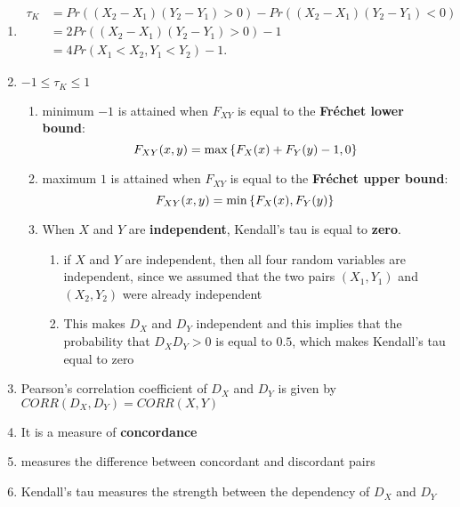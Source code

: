 \begin{enumerate}
    \item[] \begin{align*}
        \tau_K 
        &= Pr ((X_2 - X_1)(Y_2 - Y_1) > 0) - Pr ((X_2 - X_1)(Y_2 - Y_1) < 0) \\
        &= 2 Pr ((X_2 - X_1)(Y_2 - Y_1) > 0) - 1 \\
        &= 4 Pr(X_1 < X_2, Y_1 < Y_2) - 1.
    \end{align*}

    \item $-1 \leq \tau_K \leq 1$
    \begin{enumerate}
        \item minimum $-1$ is attained when $F_{XY}$ is equal to the \textbf{Fréchet lower bound}:
            \[
                F_{XY}(x, y) = \max\left\{F_X(x) + F_Y(y) - 1, 0\right\}
            \]

        \item maximum $1$ is attained when $F_{XY}$ is equal to the \textbf{Fréchet upper bound}:
            \[
                F_{XY}(x, y) = \min\left\{F_X(x), F_Y(y)\right\}
            \]

        \item When $X$ and $Y$ are \textbf{independent}, Kendall’s tau is equal to \textbf{zero}.
        \begin{enumerate}
            \item if $X$ and $Y$ are independent, then all four random variables are independent, since we assumed that the two pairs $(X_1, Y_1)$ and $(X_2, Y_2)$ were already independent
            
            \item This makes $D_X$ and $D_Y$ independent and this implies that the probability that $D_X D_Y > 0$ is equal to $0.5$, which makes Kendall’s tau equal to zero
        \end{enumerate}
    \end{enumerate}

    \item Pearson’s correlation coefficient of $D_X$ and $D_Y$ is given by $CORR(D_X, D_Y) = CORR(X, Y)$

    \item It is a measure of \textbf{concordance}

    \item measures the difference between concordant and discordant pairs

    \item Kendall’s tau measures the strength between the dependency of $D_X$ and $D_Y$


\end{enumerate}
